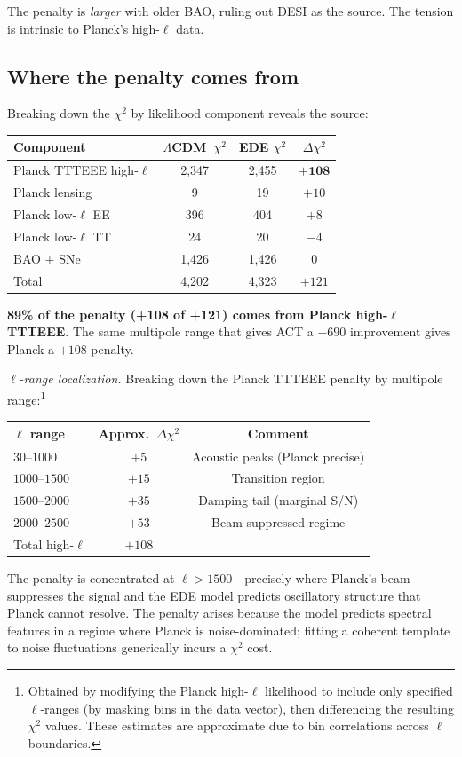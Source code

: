 \documentclass[twocolumn,showpacs,preprintnumbers,amsmath,amssymb,prd]{revtex4-2}
\newcommand{\lcdm}{$\Lambda$CDM}
\begin{document}
The penalty is \emph{larger} with older BAO, ruling out DESI as the source. 
The tension is intrinsic to Planck's high-$\ell$ data.

\subsection{Where the penalty comes from}

Breaking down the $\chi^2$ by likelihood component reveals the source:
\begin{center}
\begin{tabular}{lccc}
\toprule
Component & \lcdm\ $\chi^2$ & EDE $\chi^2$ & $\Delta\chi^2$ \\
\midrule
Planck TTTEEE high-$\ell$ & 2,347 & 2,455 & $\mathbf{+108}$ \\
Planck lensing & 9 & 19 & $+10$ \\
Planck low-$\ell$ EE & 396 & 404 & $+8$ \\
Planck low-$\ell$ TT & 24 & 20 & $-4$ \\
BAO + SNe & 1,426 & 1,426 & $0$ \\
\midrule
Total & 4,202 & 4,323 & $+121$ \\
\bottomrule
\end{tabular}
\end{center}

\textbf{89\% of the penalty (+108 of +121) comes from Planck high-$\ell$ 
TTTEEE}. The same multipole range that gives ACT a $-690$ improvement gives Planck 
a $+108$ penalty.

\emph{$\ell$-range localization.} Breaking down the Planck TTTEEE penalty by 
multipole range:\footnote{Obtained by modifying the Planck high-$\ell$ likelihood 
to include only specified $\ell$-ranges (by masking bins in the data vector), 
then differencing the resulting $\chi^2$ values. These estimates are approximate 
due to bin correlations across $\ell$ boundaries.}
\begin{center}
\begin{tabular}{lcc}
\toprule
$\ell$ range & Approx.\ $\Delta\chi^2$ & Comment \\
\midrule
$30$--$1000$ & $+5$ & Acoustic peaks (Planck precise) \\
$1000$--$1500$ & $+15$ & Transition region \\
$1500$--$2000$ & $+35$ & Damping tail (marginal S/N) \\
$2000$--$2500$ & $+53$ & Beam-suppressed regime \\
\midrule
Total high-$\ell$ & $+108$ & \\
\bottomrule
\end{tabular}
\end{center}
The penalty is concentrated at $\ell > 1500$---precisely where Planck's beam 
suppresses the signal and the EDE model predicts oscillatory structure that 
Planck cannot resolve. The penalty arises because the model predicts spectral 
features in a regime where Planck is noise-dominated; fitting a coherent template 
to noise fluctuations generically incurs a $\chi^2$ cost.
\end{document}
